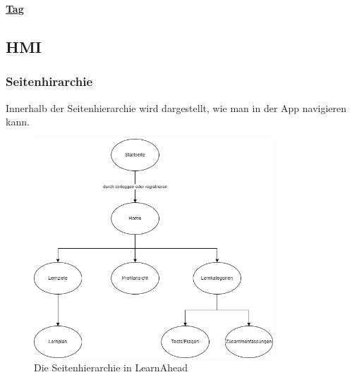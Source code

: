   \underline{\textbf{Tag}}
\begin{table}[H]
  \centering
  \end{table}
\subsection{HMI}

\subsubsection{Seitenhirarchie}
Innerhalb der Seitenhierarchie wird dargestellt, wie man in der App navigieren
kann.
\begin{figure}[H]
  \centering
  \includegraphics[width=0.8\textwidth]{images/diagramme/Seitenhierarchie.png}
  \caption{Die Seitenhierarchie in LearnAhead}
  \label{fig:UseCaseDiagramm}
\end{figure}


